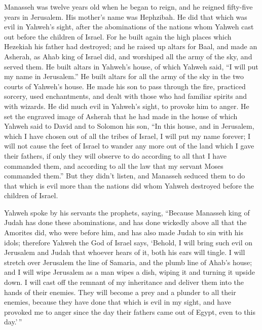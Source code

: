  Manasseh was twelve years old when he began to reign, and
he reigned fifty-five years in Jerusalem. His mother's name was
Hephzibah.  He did that which was evil in Yahweh's sight,
after the abominations of the nations whom Yahweh cast out before the
children of Israel.  For he built again the high places
which Hezekiah his father had destroyed; and he raised up altars for
Baal, and made an Asherah, as Ahab king of Israel did, and worshiped all
the army of the sky, and served them.  He built altars in
Yahweh's house, of which Yahweh said, ``I will put my name in
Jerusalem.''  He built altars for all the army of the sky
in the two courts of Yahweh's house.  He made his son to
pass through the fire, practiced sorcery, used enchantments, and dealt
with those who had familiar spirits and with wizards. He did much evil
in Yahweh's sight, to provoke him to anger.  He set the
engraved image of Asherah that he had made in the house of which Yahweh
said to David and to Solomon his son, ``In this house, and in Jerusalem,
which I have chosen out of all the tribes of Israel, I will put my name
forever;  I will not cause the feet of Israel to wander
any more out of the land which I gave their fathers, if only they will
observe to do according to all that I have commanded them, and according
to all the law that my servant Moses commanded them.'' 
But they didn't listen, and Manasseh seduced them to do that which is
evil more than the nations did whom Yahweh destroyed before the children
of Israel.

 Yahweh spoke by his servants the prophets, saying,
 ``Because Manasseh king of Judah has done these
abominations, and has done wickedly above all that the Amorites did, who
were before him, and has also made Judah to sin with his idols;
 therefore Yahweh the God of Israel says, `Behold, I will
bring such evil on Jerusalem and Judah that whoever hears of it, both
his ears will tingle.  I will stretch over Jerusalem the
line of Samaria, and the plumb line of Ahab's house; and I will wipe
Jerusalem as a man wipes a dish, wiping it and turning it upside down.
 I will cast off the remnant of my inheritance and
deliver them into the hands of their enemies. They will become a prey
and a plunder to all their enemies,  because they have
done that which is evil in my sight, and have provoked me to anger since
the day their fathers came out of Egypt, even to this day.'\,''

